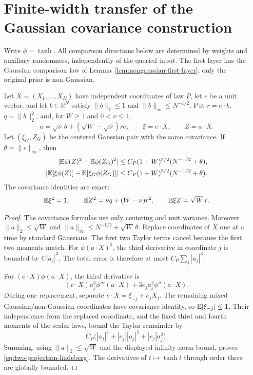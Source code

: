 \section{Finite-width transfer of the Gaussian covariance construction}
\label{sec:nongaussian-transfer}
Write $\phi=\tanh$. All comparison directions below are determined by
weights and auxiliary randomness, independently of the queried input.
The first layer has the Gaussian comparison law of
Lemma~\ref{lem:nongaussian-first-layer}; only the original prior is
non-Gaussian.

\begin{lemma}
\label{lem:two-projection-lindeberg}
Let $X=(X_1,\ldots,X_N)$ have independent coordinates of law $P$, let
$e$ be a unit vector, and let $b\in\mathbb R^N$ satisfy
$\|b\|_2\le1$ and $\|b\|_\infty\le N^{-1/2}$.
Put $r=e\cdot b$, $q=\|b\|_2^2$, and, for $W\ge1$ and $0<\nu\le1$,
\[
 a=\sqrt\nu\,b+(\sqrt W-\sqrt\nu)r e,
 \qquad \xi=e\cdot X,\qquad Z=a\cdot X.
\]
Let $(\xi_G,Z_G)$ be the centered Gaussian pair with the same
covariance. If $\theta=\|e\|_\infty$, then
\begin{align}
 |\mathbb E\phi(Z)^2-\mathbb E\phi(Z_G)^2|
 &\le C_P(1+W)^{3/2}(N^{-1/2}+\theta),\notag\\
 |\mathbb E[\xi\phi(Z)]-\mathbb E[\xi_G\phi(Z_G)]|
 &\le C_P(1+W)^{3/2}(N^{-1/2}+\theta).
 \label{eq:two-projection-lindeberg}
\end{align}
The covariance identities are exact:
\[
 \mathbb E\xi^2=1,\qquad \mathbb E Z^2=\nu q+(W-\nu)r^2,\qquad
 \mathbb E\xi Z=\sqrt W\,r.
\]
\end{lemma}
\begin{proof}
The covariance formulas use only centering and unit variance.
Moreover $\|a\|_2\le\sqrt W$ and
$\|a\|_\infty\le N^{-1/2}+\sqrt W\,\theta$.
Replace coordinates of $X$ one at a time by standard Gaussians.
The first two Taylor terms cancel because the first two moments
match. For $\phi(a\cdot X)^2$, the third derivative in coordinate
$j$ is bounded by $C|a_j|^3$. The total error is therefore at most
$C_P\sum_j|a_j|^3$.

For $(e\cdot X)\phi(a\cdot X)$, the third derivative is
\[
 (e\cdot X)a_j^3\phi'''(a\cdot X)
       +3e_j a_j^2\phi''(a\cdot X).
\]
During one replacement, separate
$e\cdot X=\xi_{-j}+e_jX_j$. The remaining mixed Gaussian/non-Gaussian
coordinates have covariance identity, so $\mathbb E|\xi_{-j}|\le1$.
Their independence from the replaced coordinate, and the fixed third
and fourth moments of the scalar laws, bound the Taylor remainder by
\[
 C_P\bigl(|a_j|^3+|e_j||a_j|^3+|e_j|a_j^2\bigr).
\]
Summing, using $\|a\|_2\le\sqrt W$ and the displayed infinity-norm
bound, proves \eqref{eq:two-projection-lindeberg}. The derivatives of
$t\mapsto\tanh t$ through order three are globally bounded.
\end{proof}

